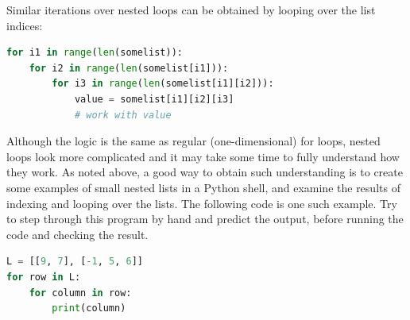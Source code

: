 \documentclass[graybox,envcountchap,sectrefs,final]{svmonodo}
\begin{document}
Similar iterations over nested loops can be obtained by looping over the list indices:
\begin{lstlisting}[language=Python,style=blue1]
for i1 in range(len(somelist)):
    for i2 in range(len(somelist[i1])):
        for i3 in range(len(somelist[i1][i2])):
            value = somelist[i1][i2][i3]
            # work with value
\end{lstlisting}

Although the logic is the same as regular (one-dimensional) for loops, nested loops look more complicated and it may take some time
to fully understand how they work. As noted above, a good way to obtain such understanding is to
create some examples of small nested lists in a Python shell, and examine the results of indexing and looping over the lists.
The following code is one such example. Try to step through this program by hand and predict the output, before running the code
and checking the result.
\begin{lstlisting}[language=Python,style=blue1bar]
L = [[9, 7], [-1, 5, 6]]
for row in L:
    for column in row:
        print(column)
\end{lstlisting}
\end{document}
